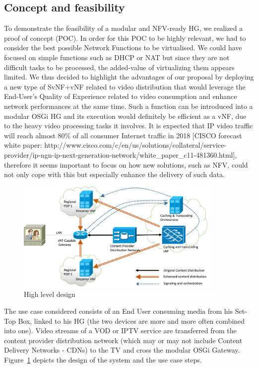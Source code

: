\subsection{Concept and feasibility}
To demonstrate the feasibility of a modular and NFV-ready HG, we realized a proof of concept (POC).
In order for this POC to be highly relevant, we had to consider the best possible Network Functions to be virtualised.
We could have focused on simple functions such as DHCP or NAT but since they are not difficult tasks to be processed, the added-value of virtualizing them appears limited.
We thus decided to highlight the advantages of our proposal by deploying a new type of SvNF+vNF related to video distribution that would leverage the End-User's Quality of Experience related to video consumption and enhance network performances at the same time.
Such a function can be introduced into a modular OSGi HG and its execution would definitely be efficient as a vNF, due to the heavy video processing tasks it involves.
It is expected that IP video traffic will reach almost 80\% of all consumer Internet traffic in 2018 [CISCO forecast white paper: http://www.cisco.com/c/en/us/solutions/collateral/service-provider/ip-ngn-ip-next-generation-network/white_paper_c11-481360.html], therefore it seems important to focus on how new solutions, such as NFV, could not only cope with this but especially enhance the delivery of such data.

\begin{figure}
	
	\center

	\includegraphics[width=0.90\textwidth,natwidth=8132,natheight=4335]{fig/highleveldesign.png}
	\caption{ High level design
    \label{fig:hld}
    }

\end{figure}


The use case considered consists of an End User consuming media from his Set-Top Box, linked to his HG (the two devices are more and more often combined into one).
Video streams of a VOD or IPTV service are transferred from the content provider distribution network (which may or may not include Content Delivery Networks - CDNs) to the TV and cross the modular OSGi Gateway.
Figure~\ref{fig:hld} depicts the design of the system and the use case steps. 
   
